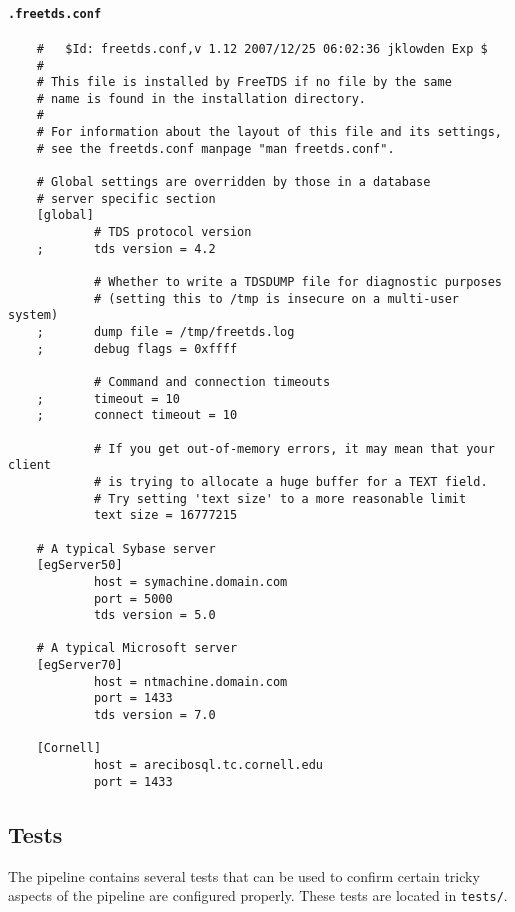 \paragraph{\texttt{.freetds.conf}}
\begin{verbatim}
    #   $Id: freetds.conf,v 1.12 2007/12/25 06:02:36 jklowden Exp $
    #
    # This file is installed by FreeTDS if no file by the same 
    # name is found in the installation directory.  
    #
    # For information about the layout of this file and its settings, 
    # see the freetds.conf manpage "man freetds.conf".  

    # Global settings are overridden by those in a database
    # server specific section
    [global]
            # TDS protocol version
    ;       tds version = 4.2

            # Whether to write a TDSDUMP file for diagnostic purposes
            # (setting this to /tmp is insecure on a multi-user system)
    ;       dump file = /tmp/freetds.log
    ;       debug flags = 0xffff

            # Command and connection timeouts
    ;       timeout = 10
    ;       connect timeout = 10
            
            # If you get out-of-memory errors, it may mean that your client
            # is trying to allocate a huge buffer for a TEXT field.  
            # Try setting 'text size' to a more reasonable limit 
            text size = 16777215

    # A typical Sybase server
    [egServer50]
            host = symachine.domain.com
            port = 5000
            tds version = 5.0

    # A typical Microsoft server
    [egServer70]
            host = ntmachine.domain.com
            port = 1433
            tds version = 7.0

    [Cornell]
            host = arecibosql.tc.cornell.edu
            port = 1433
\end{verbatim}

\subsection{Tests}
\label{sec:tests}
The pipeline contains several tests that can be used to confirm certain tricky aspects of the pipeline are configured properly. These tests are located in \texttt{tests/}.

